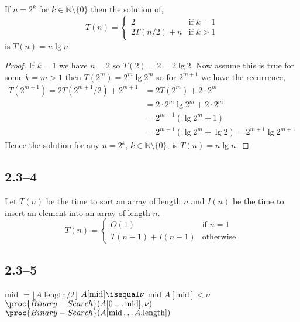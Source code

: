 \begin{proposition}
	\label{prop:power-2-recurrence}
	If $n=2^{k}$ for $k\in\mathbb{N}\setminus\{0\}$ then the solution of,
	\begin{equation*}
		T(n) =
		\begin{cases}
			2 &\text{if }k=1\\
			2T(n/2) + n &\text{if }k>1
		\end{cases}
	\end{equation*}
	is $T(n)=n\lg n$.
\end{proposition}

\begin{proof}
	If $k=1$ we have $n=2$ so $T(2) = 2 = 2\lg 2$. Now assume this is true for some $k=m>1$ then $T(2^{m}) = 2^{m}\lg 2^{m}$ so for $2^{m+1}$ we have the recurrence,
	\begin{equation*}
		\begin{aligned}
			T(2^{m+1}) = 2T(2^{m+1}/2) + 2^{m+1} &= 2T(2^{m}) + 2\cdot2^{m}\\
			&= 2\cdot2^{m}\lg 2^{m} + 2\cdot 2^{m}\\
			&= 2^{m+1}\left(\lg 2^{m} + 1\right)\\
			&= 2^{m+1}\left(\lg 2^{m} + \lg 2\right) = 2^{m+1}\lg 2^{m+1}
		\end{aligned}
	\end{equation*}
	Hence the solution for any $n=2^{k}$, $k\in\mathbb{N}\setminus\{0\}$, is $T(n)=n\lg n$.
\end{proof}

\subsection*{2.3--4}

Let $T(n)$ be the time to sort an array of length $n$ and $I(n)$ be the time to insert an element into an array of length $n$.
\begin{equation*}
	T(n) =
	\begin{cases}
		O(1)& \text{if }n=1\\
		T(n-1) + I(n-1)& \text{otherwise}
	\end{cases}
\end{equation*}

\subsection*{2.3--5}

\begin{codebox}
	\li mid $= \lfloor A.\text{length}/2 \rfloor$
	\li \If $A[\text{mid}] \isequal \nu$
	\li \Then
				\Return mid
			\End
	\li \ElseIf $A[\text{mid}]<\nu$
	\li	\Then
				$\proc{Binary-Search}(A[0\ldots \text{mid}], \nu)$
			\End
	\li \Else
	\li	\Then
				$\proc{Binary-Search}(A[\text{mid}\ldots A.\text{length}])$
			\End
	\li \Return {}
\end{codebox}

